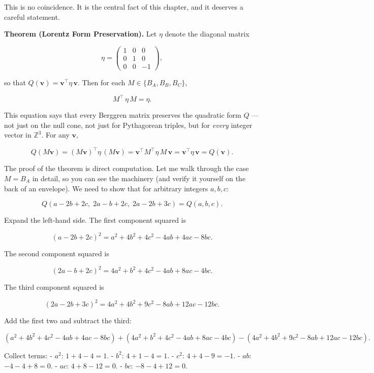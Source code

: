 This is no coincidence. It is the central fact of this chapter, and it deserves a careful statement.

\textbf{Theorem (Lorentz Form Preservation).} Let $\eta$ denote the diagonal matrix

\[
\eta = \begin{pmatrix} 1 & 0 & 0 \\ 0 & 1 & 0 \\ 0 & 0 & -1 \end{pmatrix},
\]

so that $Q(\mathbf{v}) = \mathbf{v}^\top \eta\, \mathbf{v}$. Then for each $M \in \{B_A, B_B, B_C\}$,

\[
M^{\!\top}\, \eta\, M = \eta.
\]

This equation says that every Berggren matrix preserves the quadratic form $Q$ --- not just on the null cone, not just for Pythagorean triples, but for \textit{every} integer vector in $\mathbb{Z}^3$. For any $\mathbf{v}$,

\[
Q(M\mathbf{v}) = (M\mathbf{v})^\top \eta\, (M\mathbf{v}) = \mathbf{v}^\top M^\top \eta\, M\, \mathbf{v} = \mathbf{v}^\top \eta\, \mathbf{v} = Q(\mathbf{v}).
\]

The proof of the theorem is direct computation. Let me walk through the case $M = B_A$ in detail, so you can see the machinery (and verify it yourself on the back of an envelope). We need to show that for arbitrary integers $a, b, c$:

\[
Q(a - 2b + 2c,\; 2a - b + 2c,\; 2a - 2b + 3c) = Q(a, b, c).
\]

Expand the left-hand side. The first component squared is

\[
(a - 2b + 2c)^2 = a^2 + 4b^2 + 4c^2 - 4ab + 4ac - 8bc.
\]

The second component squared is

\[
(2a - b + 2c)^2 = 4a^2 + b^2 + 4c^2 - 4ab + 8ac - 4bc.
\]

The third component squared is

\[
(2a - 2b + 3c)^2 = 4a^2 + 4b^2 + 9c^2 - 8ab + 12ac - 12bc.
\]

Add the first two and subtract the third:

\[
(a^2 + 4b^2 + 4c^2 - 4ab + 4ac - 8bc) + (4a^2 + b^2 + 4c^2 - 4ab + 8ac - 4bc) - (4a^2 + 4b^2 + 9c^2 - 8ab + 12ac - 12bc).
\]

Collect terms:
- $a^2$: $1 + 4 - 4 = 1$.
- $b^2$: $4 + 1 - 4 = 1$.
- $c^2$: $4 + 4 - 9 = -1$.
- $ab$: $-4 - 4 + 8 = 0$.
- $ac$: $4 + 8 - 12 = 0$.
- $bc$: $-8 - 4 + 12 = 0$.

